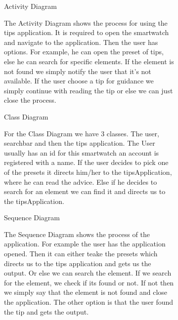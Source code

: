 \documentclass{article}
\begin{document}
		\begin{figure}[htbp]
			\centering
			\begin{subfigure}{\textwidth}
				\resizebox{\textwidth}{!}{}
				\caption{Activity Diagram}
			\end{subfigure}
			\begin{subfigure}{\textwidth}
				The Activity Diagram shows the process for using the tips application. It is required to open the smartwatch and 
				navigate to the application. Then the user has options. For example, he can open the preset of tips, else he can search
				for specific elements. If the element is not found we simply notify the user that it's not available. 
				If the user choose a tip for guidance we simply continue with reading the tip or else we can just close the process. 
			\end{subfigure}
		\end{figure}
		\newpage

		\begin{figure}[htbp]
			\centering
			\begin{subfigure}{\textwidth}
				\resizebox{\textwidth}{!}{}
				\caption{Class Diagram}
			\end{subfigure}
			\begin{subfigure}{\textwidth}
				For the Class Diagram we have 3 classes. The user, searchbar and then the tips application. The User usually 
				has an id for this smartwatch an account is registered with a name. If the user decides to pick one of the presets
				it directs him/her to the tipsApplication, where he can read the advice. Else if he decides to search for an element 
				we can find it and directs us to the tipsApplication. 
			\end{subfigure}
		\end{figure}
		\newpage

		\begin{figure}[htbp]
			\centering
			\begin{subfigure}{\textwidth}
				\resizebox{\textwidth}{!}{}
				\caption{Sequence Diagram}
			\end{subfigure}
			\begin{subfigure}{\textwidth}
				The Sequence Diagram shows the process of the application. For example the user has the application opened. Then it can
				either teake the presets which directs us to the tips application and gets us the output. Or else we can search the element. 
				If we search for the element, we check if its found or not. If not then we simply say that the element is not found and close the application. 
				The other option is that the user found the tip and gets the output. 
			\end{subfigure}
		\end{figure}
		\newpage
\end{document}
